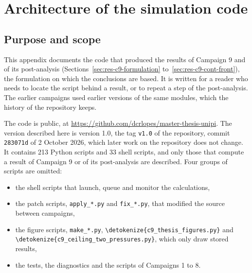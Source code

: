 
\chapter{Architecture of the simulation code}\label{app:code-architecture}

\providecommand{\file}[1]{\expandafter\nolinkurl\expandafter{\detokenize{#1}}}

\section{Purpose and scope}\label{sec:arch-scope}

This appendix documents the code that produced the results of
Campaign 9 and of its post-analysis (Sections~\ref{sec:res-c9-formulation}
to~\ref{sec:res-c9-cont-front}), the formulation on which
the conclusions are based. It is written for a reader who needs to locate the
script behind a result, or to repeat a step of the post-analysis. The
earlier campaigns used earlier versions of the same modules, which the
history of the repository keeps.

The code is public, at
\url{https://github.com/dcrlopes/master-thesis-unipi}. The version
described here is version 1.0, the tag \texttt{v1.0} of the repository,
commit \texttt{283071d} of 2 October 2026, which later work on the
repository does not change. It contains 213 Python scripts and 33
shell scripts, and only those that compute a result of Campaign 9 or of
its post-analysis are described. Four groups of scripts are omitted:

\begin{itemize}[nosep]
  \item the shell scripts that launch, queue and monitor the
        calculations,
  \item the patch scripts, \texttt{apply\_*.py} and \texttt{fix\_*.py},
        that modified the source between campaigns,
  \item the figure scripts, \texttt{make\_*.py},
        \file{c9_thesis_figures.py} and \file{c9_ceiling_two_pressures.py},
        which only draw stored results,
  \item the tests, the diagnostics and the scripts of Campaigns 1 to 8.
\end{itemize}

